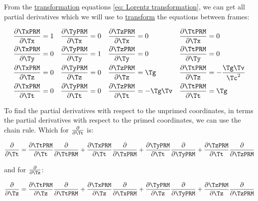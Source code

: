 \begin{derivation}

	From the \hyperlink{def-transform}{transformation} equations \eqref{eq: Lorentz transformation}, we can get all partial derivatives which we will use to \hyperlink{def-transform}{transform} the equations between frames:

	\begin{equation}
		\begin{aligned}
			\frac{\partial \TxPRM }{\partial \Tx } & = 1 & \frac{\partial \TyPRM }{\partial \Tx } & = 0 & \frac{\partial \TzPRM }{\partial \Tx } & = 0         & \frac{\partial \TtPRM }{\partial \Tx } & = 0                     \\
			\frac{\partial \TxPRM }{\partial \Ty } & = 0 & \frac{\partial \TyPRM }{\partial \Ty } & = 1 & \frac{\partial \TzPRM }{\partial \Ty } & = 0         & \frac{\partial \TtPRM }{\partial \Ty } & = 0                     \\
			\frac{\partial \TxPRM }{\partial \Tz } & = 0 & \frac{\partial \TyPRM }{\partial \Tz } & = 0 & \frac{\partial \TzPRM }{\partial \Tz } & = \Tg     & \frac{\partial \TtPRM }{\partial \Tz } & = -\frac{\Tg  \Tv }{\Tc ^2} \\
			\frac{\partial \TxPRM }{\partial \Tt } & = 0 & \frac{\partial \TyPRM }{\partial \Tt } & = 0 & \frac{\partial \TzPRM }{\partial \Tt } & = -\Tg  \Tv  & \frac{\partial \TtPRM }{\partial \Tt } & = \Tg
		\end{aligned}
	\end{equation}

	To find the partial derivatives with respect to the unprimed coordinates, in terms the partial derivatives with respect to the primed coordinates, we can use the chain rule.
	Which for $\frac{\partial}{\partial \Tt }$ is:

	\begin{equation}
		\frac{\partial}{\partial \Tt } = \frac{\partial \TtPRM }{\partial \Tt }\frac{\partial}{\partial \TtPRM } + \frac{\partial \TxPRM }{\partial \Tt }\frac{\partial}{\partial \TxPRM } + \frac{\partial \TyPRM }{\partial \Tt }\frac{\partial}{\partial \TyPRM } + \frac{\partial \TzPRM }{\partial \Tt }\frac{\partial}{\partial \TzPRM }
	\end{equation}

	and for $\frac{\partial}{\partial \Tz }$:

	\begin{equation}
		\frac{\partial}{\partial \Tz } = \frac{\partial \TtPRM }{\partial \Tz } \frac{\partial}{\partial \TtPRM } + \frac{\partial \TxPRM }{\partial \Tz } \frac{\partial}{\partial \TxPRM } + \frac{\partial \TyPRM }{\partial \Tz } \frac{\partial}{\partial \TyPRM } + \frac{\partial \TzPRM }{\partial \Tz } \frac{\partial}{\partial \TzPRM }
	\end{equation}


\end{derivation}

